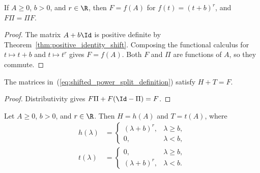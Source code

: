 \begin{theorem}
    \label{thm:shifted_power_functional_calculus}
    \leanok
    If $A\ge0$, $b>0$, and $r\in\R$, then $F=f(A)$ for
    $f(t)=(t+b)^r$, and $F\Pi=\Pi F$.
\end{theorem}

\begin{proof}
    \leanok
    The matrix $A+b\Id$ is positive definite by
    Theorem~\ref{thm:positive_identity_shift}. Composing the functional
    calculus for $t\mapsto t+b$ and $t\mapsto t^r$ gives $F=f(A)$.
    Both $F$ and $\Pi$ are functions of $A$, so they commute.
\end{proof}

\begin{theorem}
    \label{thm:shifted_power_split}
    \leanok
    The matrices in~(\ref{eq:shifted_power_split_definition}) satisfy $H+T=F$.
\end{theorem}

\begin{proof}
    \leanok
    Distributivity gives $F\Pi+F(\Id-\Pi)=F$.
\end{proof}

\begin{theorem}
    \label{thm:shifted_power_truncated_functions}
    \leanok
    Let $A\ge0$, $b>0$, and $r\in\R$. Then $H=h(A)$ and $T=t(A)$,
    where
    \begin{align}
        h(\lambda) & =
        \begin{cases}(\lambda+b)^r,&\lambda\ge b,\\0,&\lambda<b,\end{cases}
        \label{eq:shifted_power_head_function} \\
        t(\lambda) & =
        \begin{cases}0,&\lambda\ge b,\\(\lambda+b)^r,&\lambda<b.\end{cases}
        \label{eq:shifted_power_tail_function}
    \end{align}
\end{theorem}

